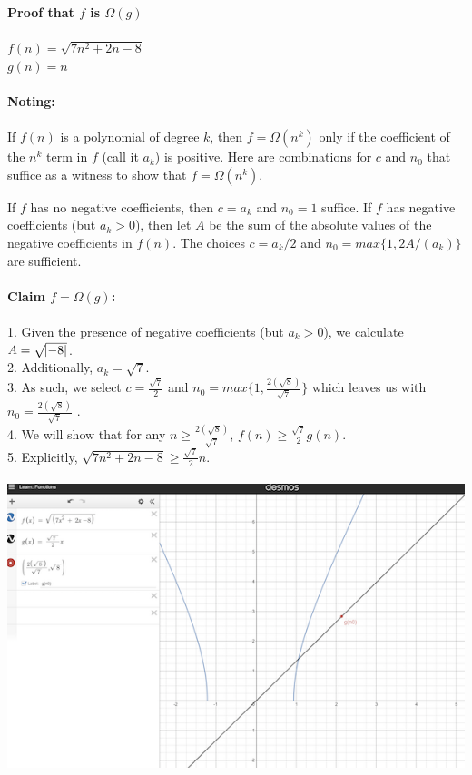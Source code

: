 \documentclass[OPONE]{example}
\begin{document}
\begin{list}{}{}
\newpage
	
\textbf{Proof that $f$ is $\Omega(g)$} \\ 
\\
$f(n) = \sqrt{7n^{2} + 2n - 8} $ \\
$g(n) = n$ \\
\\
\textbf{Noting: }\\
\\
If $f(n)$ is a polynomial of degree $k$, then $f = \Omega(n^{k})$ only if the coefficient of the $n^{k}$ term in $f$ (call it $a_{k}$) is positive. Here are combinations for $c$ and $n_{0}$ that suffice as a witness to show that $f = \Omega(n^{k})$.

If $f$ has no negative coefficients, then $c = a_{k}$ and $n_{0} = 1$ suffice.
If $f$ has negative coefficients (but $a_{k} > 0$), then let $A$ be the sum of the absolute values of the negative coefficients in $f(n)$. The choices $c = a_{k}/2$ and $n_{0} = max\{1, 2A/(a_{k})\}$ are sufficient. \\
\\
\textbf{Claim $f = \Omega(g)$: }\\
\\
1. Given the presence of negative coefficients (but $a_{k} > 0$),  we calculate $A = \sqrt{\abs{-8}}$.\\
2. Additionally, $a_{k} = \sqrt{7}$. \\
3. As such, we select $c = \frac{\sqrt{7}}{2}$ and $n_{0} = max\{1, 
		\frac{
			2(\sqrt{8})
		}{
			\sqrt{7}
		}
\}$ which leaves us with $n_{0} = 
		\frac{
			2(\sqrt{8})
		}{
			\sqrt{7}
		}$
.  \\
4. We will show that for any $n \geq 
			\frac{
			2(\sqrt{8})
		}{
			\sqrt{7}
}$, $f(n) \geq \frac{\sqrt{7}}{2}g(n)$. \\
5. Explicitly, $ \sqrt{7n^{2} + 2n - 8}  \geq  \frac{\sqrt{7}}{2}n$.\\
\\
\includegraphics{graphb2} \\ 

\end{list}
\end{document}
